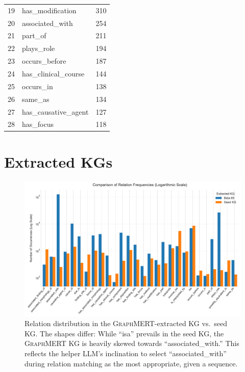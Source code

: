 \documentclass[10pt]{article}
\newcommand{\ours}{\textsc{GraphMERT}\xspace}
\begin{document}
\begin{appendices}
\begin{table}[t!]
\begin{subtable}[t]{0.48\textwidth}
\begin{tabular}{c l r}
      19 & has\_modification            & 310 \\
      20 & associated\_with             & 254 \\
      21 & part\_of                     & 211 \\
      22 & plays\_role                  & 194 \\
      23 & occurs\_before               & 187 \\
      24 & has\_clinical\_course        & 144 \\
      25 & occurs\_in                   & 138 \\
      26 & same\_as                     & 134 \\
      27 & has\_causative\_agent        & 127 \\
      28 & has\_focus                   & 118 \\
      \bottomrule
    \end{tabular}
  \end{subtable}
\end{table}




\clearpage
\section{Extracted KGs}
\label{app:extracted_kgs}
\setcounter{table}{0}
\renewcommand{\thetable}{C\arabic{table}}
\setcounter{figure}{0}
\renewcommand{\thefigure}{C\arabic{figure}}

\begin{figure}[t]
\centering
\includegraphics[width=\linewidth]{charts/relation_distribution_in_kgs.pdf}
\caption{Relation distribution in the \ours-extracted KG vs.~seed KG. The shapes differ: While ``isa'' prevails in the seed KG, the \ours KG is heavily skewed towards ``associated\_with.'' This reflects the helper LLM's inclination to select ``associated\_with'' during relation matching as the most appropriate, given a sequence.}
\label{fig:relation_distribution_in_kgs}
\end{figure}


\end{appendices}
\end{document}
